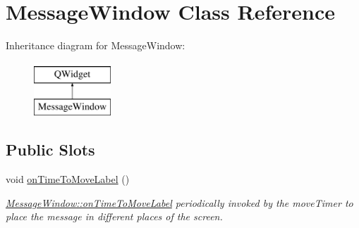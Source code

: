 \hypertarget{classMessageWindow}{}\section{Message\+Window Class Reference}
\label{classMessageWindow}
Inheritance diagram for Message\+Window\+:\begin{figure}[H]
\begin{center}
\leavevmode
\includegraphics[height=2.000000cm]{d4/d20/classMessageWindow}
\end{center}
\end{figure}
\subsection*{Public Slots}
\begin{DoxyCompactItemize}
\item 
\mbox{\label{classMessageWindow_a663c12dd71502b6b69cc610540f12e1c}} 
void \mbox{\hyperlink{classMessageWindow_a663c12dd71502b6b69cc610540f12e1c}{on\+Time\+To\+Move\+Label}} ()
\begin{DoxyCompactList}\small\item\em \mbox{\hyperlink{classMessageWindow_a663c12dd71502b6b69cc610540f12e1c}{Message\+Window\+::on\+Time\+To\+Move\+Label}} periodically invoked by the move\+Timer to place the message in different places of the screen. \end{DoxyCompactList}\end{DoxyCompactItemize}
